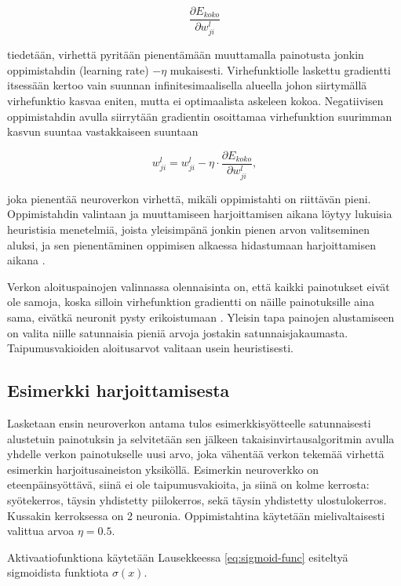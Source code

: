 \documentclass[finnish]{tktltiki2}
\theoremstyle{definition}
\theoremstyle{remark}
\begin{document}
  $$\frac{\partial E_{koko}}{\partial w_{ji}^{l}}$$
  
  \noindent tiedetään, virhettä pyritään pienentämään muuttamalla painotusta jonkin oppimistahdin (learning rate) $-\eta$ mukaisesti. Virhefunktiolle laskettu gradientti itsessään kertoo vain suunnan infinitesimaalisella alueella johon siirtymällä virhefunktio kasvaa eniten, mutta ei optimaalista askeleen kokoa. Negatiivisen oppimistahdin avulla siirrytään gradientin osoittamaa virhefunktion suurimman kasvun suuntaa vastakkaiseen suuntaan

  $$ w_{ji}^{l} = w_{ji}^{l} - \eta \cdot \frac{\partial E_{koko}}{\partial w_{ji}^{l}}, $$

  \noindent joka pienentää neuroverkon virhettä, mikäli oppimistahti on riittävän pieni. Oppimistahdin valintaan ja muuttamiseen harjoittamisen aikana löytyy lukuisia heuristisia menetelmiä, joista yleisimpänä jonkin pienen arvon valitseminen aluksi, ja sen pienentäminen oppimisen alkaessa hidastumaan harjoittamisen aikana \cite{Goodfellow-et-al-2016}\cite{KSHimagenet2012}. 

  Verkon aloituspainojen valinnassa olennaisinta on, että kaikki painotukset eivät ole samoja, koska silloin virhefunktion gradientti on näille painotuksille aina sama, eivätkä neuronit pysty erikoistumaan \cite{Goodfellow-et-al-2016}. Yleisin tapa painojen alustamiseen on valita niille satunnaisia pieniä arvoja jostakin satunnaisjakaumasta. Taipumusvakioiden aloitusarvot valitaan usein heuristisesti.

  \subsection{Esimerkki harjoittamisesta}

  Lasketaan ensin neuroverkon antama tulos esimerkkisyötteelle satunnaisesti alustetuin painotuksin ja selvitetään sen jälkeen takaisinvirtausalgoritmin avulla yhdelle verkon painotukselle uusi arvo, joka vähentää verkon tekemää virhettä esimerkin harjoitusaineiston yksiköllä. Esimerkin neuroverkko on eteenpäinsyöttävä, siinä ei ole taipumusvakioita, ja siinä on kolme kerrosta: syötekerros, täysin yhdistetty piilokerros, sekä täysin yhdistetty ulostulokerros. Kussakin kerroksessa on 2 neuronia. Oppimistahtina käytetään mielivaltaisesti valittua arvoa $\eta = 0.5$.

   Aktivaatiofunktiona käytetään Lausekkeessa \ref{eq:sigmoid-func} esiteltyä sigmoidista funktiota $\sigma (x)$.
\end{document}
